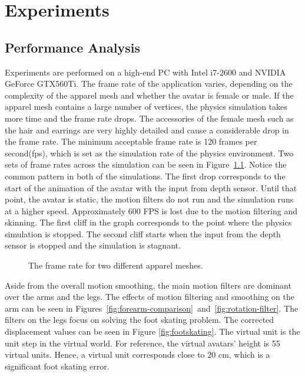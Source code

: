 \chapter{Experiments}
\label{chapter_experiments}

\section{Performance Analysis}

Experiments are performed on a high-end PC with Intel i7-2600 and NVIDIA GeForce GTX560Ti. The frame rate of the application varies, depending on the complexity of the apparel mesh and whether the avatar is female or male. If the apparel mesh contains a large number of vertices, the physics simulation takes more time and the frame rate drops. The accessories of the female mesh such as the hair and earrings are very highly detailed and cause a considerable drop in the frame rate. The minimum acceptable frame rate is 120 frames per second(fps), which is set as the simulation rate of the physics environment. Two sets of frame rates across the simulation can be seen in Figure~\ref{fig:fps}. Notice the common pattern in both of the simulations. The first drop corresponds to the start of the animation of the avatar with the input from depth sensor. Until that point, the avatar is static, the motion filters do not run and the simulation runs at a higher speed. Approximately 600 FPS is lost due to the motion filtering and skinning. The first cliff in the graph corresponds to the point where the physics simulation is stopped. The second cliff starts when the input from the depth sensor is stopped and the simulation is stagnant.  

\begin{figure}[htbp]
	\begin{center} 
	\end{center}
	\caption{The frame rate for two different apparel meshes.}
	\label{fig:fps}
\end{figure}

Aside from the overall motion smoothing, the main motion filters are dominant over the arms and the legs. The effects of motion filtering and smoothing on the arm can be seen in Figures~\ref{fig:forearm-comparison}~and~\ref{fig:rotation-filter}. The filters on the legs focus on solving the foot skating problem. The corrected displacement values can be seen in Figure \ref{fig:footskating}. The virtual unit is the unit step in the virtual world. For reference, the virtual avatars' height is 55 virtual units. Hence, a virtual unit corresponds close to 20 cm, which is a significant foot skating error.  



